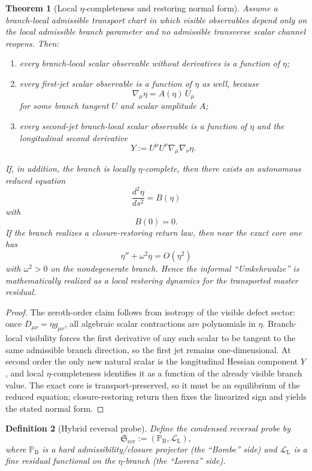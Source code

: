 \documentclass[12pt,a4paper]{article}
\newtheorem{theorem}{Theorem}[section]
\newtheorem{definition}[theorem]{Definition}
\begin{document}
\begin{theorem}[Local $\eta$-completeness and restoring normal form]
\label{thm:eta-completeness-restoring}
Assume a branch-local admissible transport chart in which visible observables depend only on the local admissible branch parameter and no admissible transverse scalar channel reopens. Then:
\begin{enumerate}[label=(\roman*)]
 \item every branch-local scalar observable without derivatives is a function of $\eta$;
 \item every first-jet scalar observable is a function of $\eta$ as well, because
 \[
 \nabla_\mu \eta = A(\eta)\,U_\mu
 \]
 for some branch tangent $U$ and scalar amplitude $A$;
 \item every second-jet branch-local scalar observable is a function of $\eta$ and the longitudinal second derivative
 \[
 Y:=U^\mu U^\nu \nabla_\mu\nabla_\nu\eta.
 \]
\end{enumerate}
If, in addition, the branch is locally $\eta$-complete, then there exists an autonomous reduced equation
\[
 \frac{d^2\eta}{ds^2}=B(\eta)
\]
with
\[
 B(0)=0.
\]
If the branch realizes a closure-restoring return law, then near the exact core one has
\[
 \eta''+\omega^2\eta=O(\eta^2)
\]
with $\omega^2>0$ on the nondegenerate branch. Hence the informal ``Umkehrwalze'' is mathematically realized as a local restoring dynamics for the transported master residual.
\end{theorem}

\begin{proof}
The zeroth-order claim follows from isotropy of the visible defect sector: once $D_{\mu\nu}=\eta g_{\mu\nu}$, all algebraic scalar contractions are polynomials in $\eta$. Branch-local visibility forces the first derivative of any such scalar to be tangent to the same admissible branch direction, so the first jet remains one-dimensional. At second order the only new natural scalar is the longitudinal Hessian component $Y$, and local $\eta$-completeness identifies it as a function of the already visible branch value. The exact core is transport-preserved, so it must be an equilibrium of the reduced equation; closure-restoring return then fixes the linearized sign and yields the stated normal form.
\end{proof}

\begin{definition}[Hybrid reversal probe]
Define the condensed reversal probe by
\[
 \mathfrak S_{\mathrm{rev}}:=(\mathbb P_{\mathrm B},\mathcal L_{\mathrm L}),
\]
where $\mathbb P_{\mathrm B}$ is a hard admissibility/closure projector (the ``Bombe'' side) and $\mathcal L_{\mathrm L}$ is a fine residual functional on the $\eta$-branch (the ``Lorenz'' side).
\end{definition}
\end{document}
